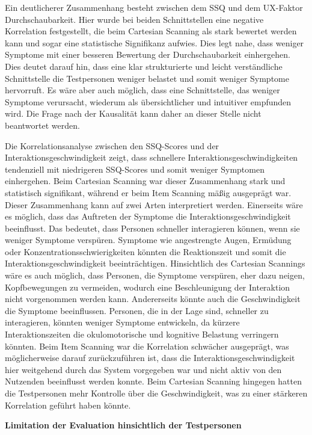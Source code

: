 Ein deutlicherer Zusammenhang besteht zwischen dem SSQ und dem UX-Faktor Durchschaubarkeit. Hier wurde bei beiden Schnittstellen eine negative Korrelation festgestellt, die beim Cartesian Scanning als stark bewertet werden kann und sogar eine statistische Signifikanz aufwies. Dies legt nahe, dass weniger Symptome mit einer besseren Bewertung der Durchschaubarkeit einhergehen. Dies deutet darauf hin, dass eine klar strukturierte und leicht verständliche Schnittstelle die Testpersonen weniger belastet und somit weniger Symptome hervorruft. Es wäre aber auch möglich, dass eine Schnittstelle, das weniger Symptome verursacht, wiederum als übersichtlicher und intuitiver empfunden wird. Die Frage nach der Kausalität kann daher an dieser Stelle nicht beantwortet werden. 

Die Korrelationsanalyse zwischen den SSQ-Scores und der Interaktionsgeschwindigkeit zeigt, dass schnellere Interaktionsgeschwindigkeiten tendenziell mit niedrigeren SSQ-Scores und somit weniger Symptomen einhergehen. Beim Cartesian Scanning war dieser Zusammenhang stark und statistisch signifikant, während er beim Item Scanning mäßig ausgeprägt war. Dieser Zusammenhang kann auf zwei Arten interpretiert werden. Einerseits wäre es möglich, dass das Auftreten der Symptome die Interaktionsgeschwindigkeit beeinflusst. Das bedeutet, dass Personen schneller interagieren können, wenn sie weniger Symptome verspüren. Symptome wie angestrengte Augen, Ermüdung oder Konzentrationsschwierigkeiten könnten die Reaktionszeit und somit die Interaktionsgeschwindigkeit beeinträchtigen. Hinsichtlich des Cartesian Scannings wäre es auch möglich, dass Personen, die Symptome verspüren, eher dazu neigen, Kopfbewegungen zu vermeiden, wodurch eine Beschleunigung der Interaktion nicht vorgenommen werden kann. Andererseits könnte auch die Geschwindigkeit die Symptome beeinflussen. Personen, die in der Lage sind, schneller zu interagieren, könnten weniger Symptome entwickeln, da kürzere Interaktionszeiten die okulomotorische und kognitive Belastung verringern könnten.
Beim Item Scanning war die Korrelation schwächer ausgeprägt, was möglicherweise darauf zurückzuführen ist, dass die Interaktionsgeschwindigkeit hier weitgehend durch das System vorgegeben war und nicht aktiv von den Nutzenden beeinflusst werden konnte. Beim Cartesian Scanning hingegen hatten die Testpersonen mehr Kontrolle über die Geschwindigkeit, was zu einer stärkeren Korrelation geführt haben könnte.

\textbf{Limitation der Evaluation hinsichtlich der Testpersonen}

